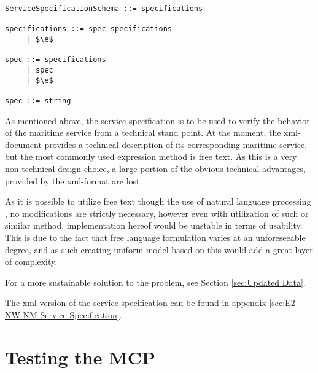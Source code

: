 \begin{lstlisting}[keywordstyle={}, label={lst:sSpecRed}, caption={Reduced parser grammar of Service Specification Schema}]
ServiceSpecificationSchema ::= specifications

specifications ::= spec specifications
     | $\e$
     
spec ::= specifications
     | spec
     | $\e$

spec ::= string
\end{lstlisting}

As mentioned above, the service specification is to be used to verify the behavior of the maritime service from a technical stand point. At the moment, the xml-document provides a technical description of its corresponding maritime service, but the most commonly used expression method is free text. As this is a very non-technical design choice, a large portion of the obvious technical advantages, provided by the xml-format are lost. 

As it is possible to utilize free text though the use of natural language processing \cite{nlp}, no modifications are strictly necessary, however even with utilization of such or similar method, implementation hereof would be unstable in terms of usability. This is due to the fact that free language formulation varies at an unforeseeable degree, and as such creating uniform model based on this would add a great layer of complexity.

For a more sustainable solution to the problem, see Section \ref{sec:Updated Data}.

The xml-version of the service specification can be found in appendix \ref{sec:E2 - NW-NM Service Specification}.

\section{Testing the MCP}

